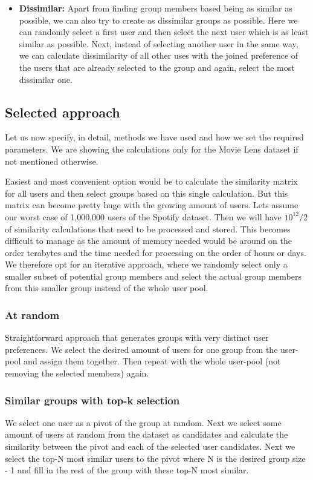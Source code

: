 \begin{itemize}
    \item \textbf{Dissimilar:}
        Apart from finding group members based being as similar as possible, we can also try to create as dissimilar groups as possible. Here we can randomly select a first user and then select the next user which is as least similar as possible. Next, instead of selecting another user in the same way, we can calculate dissimilarity of all other uses with the joined preference of the users that are already selected to the group and again, select the most dissimilar one.
\end{itemize}


\subsection{Selected approach}
Let us now specify, in detail, methods we have used and how we set the required parameters. We are showing the calculations only for the Movie Lens dataset if not mentioned otherwise.

Easiest and most convenient option would be to calculate the similarity matrix for all users and then select groups based on this single calculation. But this matrix can become pretty huge with the growing amount of users. Lets assume our worst case of 1,000,000 users of the Spotify dataset. Then we will have $10^{12}/2$ of similarity calculations that need to be processed and stored. This becomes difficult to manage as the amount of memory needed would be around on the order terabytes and the time needed for processing on the order of hours or days. We therefore opt for an iterative approach, where we randomly select only a smaller subset of potential group members and select the actual group members from this smaller group instead of the whole user pool.

\subsubsection{At random}
Straightforward approach that generates groups with very distinct user preferences. We select the desired amount of users for one group from the user-pool and assign them together. Then repeat with the whole user-pool (not removing the selected members) again.

\subsubsection{Similar groups with top-k selection}
We select one user as a pivot of the group at random. Next we select some amount of users at random from the dataset as candidates and calculate the similarity between the pivot and each of the selected user candidates. Next we select the top-N most similar users to the pivot where N is the desired group size - 1 and fill in the rest of the group with these top-N most similar.

